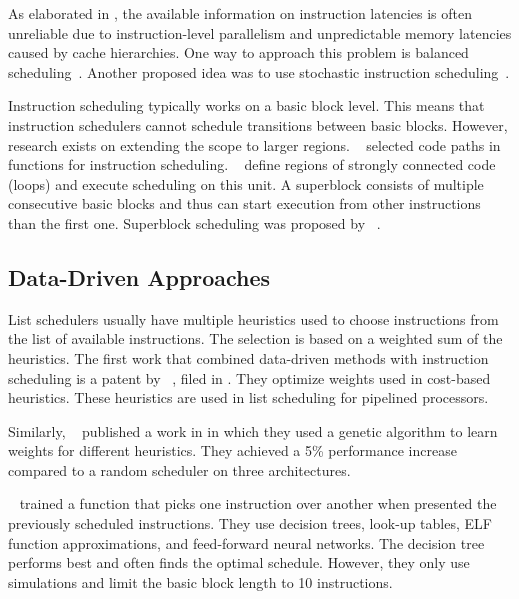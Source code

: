 As elaborated in , the available information on instruction latencies is often unreliable due to instruction-level parallelism and unpredictable memory latencies caused by cache hierarchies.
One way to approach this problem is balanced scheduling~\cite{kerns1993balanced,lo1995improving}.
Another proposed idea was to use stochastic instruction scheduling~\cite{schielke2000stochastic}.

Instruction scheduling typically works on a basic block level.
This means that instruction schedulers cannot schedule transitions between basic blocks.
However, research exists on extending the scope to larger regions.
\citeauthor{fisher1981trace}~\cite{fisher1981trace} selected code paths in functions for instruction scheduling.
\citeauthor{bernstein1991global}~\cite{bernstein1991global} define regions of strongly connected code (\eg loops) and execute scheduling on this unit.
A superblock consists of multiple consecutive basic blocks and thus can start execution from other instructions than the first one.
Superblock scheduling was proposed by \citeauthor{hwu1993superblock}~\cite{hwu1993superblock}.

\subsection{Data-Driven Approaches}
List schedulers usually have multiple heuristics used to choose instructions from the list of available instructions.
The selection is based on a weighted sum of the heuristics.
The first work that combined data-driven methods with instruction scheduling is a patent by \citeauthor{tarsy1994method}~\cite{tarsy1994method}, filed in \citeyear{tarsy1994method}.
They optimize weights used in cost-based heuristics.
These heuristics are used in list scheduling for pipelined processors.

Similarly, \citeauthor{beaty1996using}~\cite{beaty1996using} published a work in \citeyear{beaty1996using} in which they used a genetic algorithm to learn weights for different heuristics.
They achieved a 5\% performance increase compared to a random scheduler on three architectures.

\citeauthor{moss1997learning}~\cite{moss1997learning} trained a function that picks one instruction over another when presented the previously scheduled instructions.
They use decision trees, look-up tables, ELF function approximations, and feed-forward neural networks.
The decision tree performs best and often finds the optimal schedule.
However, they only use simulations and limit the basic block length to 10 instructions.

